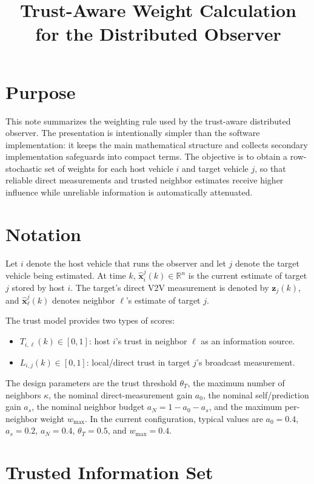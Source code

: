 \documentclass[11pt]{article}
\title{Trust-Aware Weight Calculation for the Distributed Observer}
\author{}
\date{}
\newcommand{\R}{\mathbb{R}}
\begin{document}
\maketitle

\section{Purpose}

This note summarizes the weighting rule used by the trust-aware distributed
observer. The presentation is intentionally simpler than the software
implementation: it keeps the main mathematical structure and collects secondary
implementation safeguards into compact terms. The objective is to obtain a
row-stochastic set of weights for each host vehicle \(i\) and target vehicle
\(j\), so that reliable direct measurements and trusted neighbor estimates
receive higher influence while unreliable information is automatically
attenuated.

\section{Notation}

Let \(i\) denote the host vehicle that runs the observer and let \(j\) denote
the target vehicle being estimated. At time \(k\),
\(\hat{\bm{x}}_{i}^{j}(k)\in\R^{n}\) is the current estimate of target \(j\)
stored by host \(i\). The target's direct V2V measurement is denoted by
\(\bm{z}_{j}(k)\), and \(\hat{\bm{x}}_{\ell}^{j}(k)\) denotes neighbor
\(\ell\)'s estimate of target \(j\).

The trust model provides two types of scores:
\begin{itemize}
    \item \(T_{i,\ell}(k)\in[0,1]\): host \(i\)'s trust in neighbor
    \(\ell\) as an information source.
    \item \(L_{i,j}(k)\in[0,1]\): local/direct trust in target \(j\)'s
    broadcast measurement.
\end{itemize}
The design parameters are the trust threshold \(\theta_T\), the maximum number
of neighbors \(\kappa\), the nominal direct-measurement gain \(a_0\), the
nominal self/prediction gain \(a_s\), the nominal neighbor budget
\(a_N=1-a_0-a_s\), and the maximum per-neighbor weight \(w_{\max}\). In the
current configuration, typical values are \(a_0=0.4\), \(a_s=0.2\),
\(a_N=0.4\), \(\theta_T=0.5\), and \(w_{\max}=0.4\).

\section{Trusted Information Set}
\end{document}
